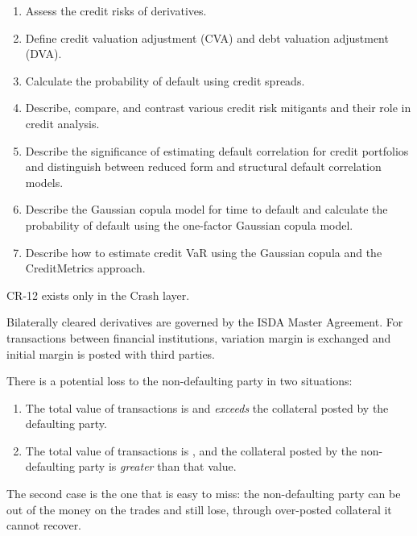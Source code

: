 
\begin{crkeybox}
\begin{enumerate}[label=\textbf{\alph*.},leftmargin=2em]
\item Assess the credit risks of derivatives.
\item Define credit valuation adjustment (CVA) and debt valuation adjustment (DVA).
\item Calculate the probability of default using credit spreads.
\item Describe, compare, and contrast various credit risk mitigants and their role in credit analysis.
\item Describe the significance of estimating default correlation for credit portfolios and distinguish between reduced form and structural default correlation models.
\item Describe the Gaussian copula model for time to default and calculate the probability of default using the one-factor Gaussian copula model.
\item Describe how to estimate credit VaR using the Gaussian copula and the CreditMetrics approach.
\end{enumerate}
\end{crkeybox}

\begin{crtrapbox}
CR-12 exists only in the Crash layer.
\end{crtrapbox}


Bilaterally cleared derivatives are governed by the ISDA Master Agreement. For
transactions between financial institutions, variation margin is exchanged and
initial margin is posted with third parties.

\begin{crkeybox}
There is a potential loss to the non-defaulting party in two situations:

\begin{enumerate}
\item The total value of transactions is  and \emph{exceeds} the collateral posted by the defaulting party.
\item The total value of transactions is ,
and the collateral posted by the non-defaulting party is \emph{greater} than that
value.
\end{enumerate}

The second case is the one that is easy to miss: the non-defaulting party can be
out of the money on the trades and still lose, through over-posted collateral it
cannot recover.
\end{crkeybox}

